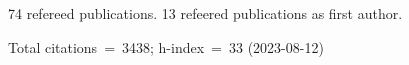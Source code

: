74 refereed publications. 13 refeered publications as first author.

Total citations~=~3438; h-index~=~33 (2023-08-12)